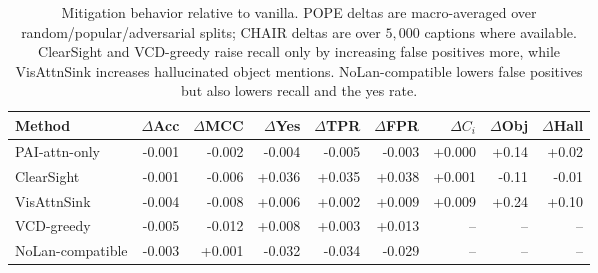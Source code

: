 \begin{table}[t]
\centering
\small
\setlength{\tabcolsep}{4.2pt}
\begin{tabular}{lrrrrrrrr}
\toprule
Method & $\Delta$Acc & $\Delta$MCC & $\Delta$Yes & $\Delta$TPR & $\Delta$FPR & $\Delta C_i$ & $\Delta$Obj & $\Delta$Hall \\
\midrule
PAI-attn-only & -0.001 & -0.002 & -0.004 & -0.005 & -0.003 & +0.000 & +0.14 & +0.02 \\
ClearSight    & -0.001 & -0.006 & +0.036 & +0.035 & +0.038 & +0.001 & -0.11 & -0.01 \\
VisAttnSink   & -0.004 & -0.008 & +0.006 & +0.002 & +0.009 & +0.009 & +0.24 & +0.10 \\
VCD-greedy    & -0.005 & -0.012 & +0.008 & +0.003 & +0.013 & -- & -- & -- \\
NoLan-compatible & -0.003 & +0.001 & -0.032 & -0.034 & -0.029 & -- & -- & -- \\
\bottomrule
\end{tabular}
\caption{Mitigation behavior relative to vanilla. POPE deltas are macro-averaged over random/popular/adversarial splits; CHAIR deltas are over $5{,}000$ captions where available. ClearSight and VCD-greedy raise recall only by increasing false positives more, while VisAttnSink increases hallucinated object mentions. NoLan-compatible lowers false positives but also lowers recall and the yes rate.}
\label{tab:pope-mitigation}
\end{table}
